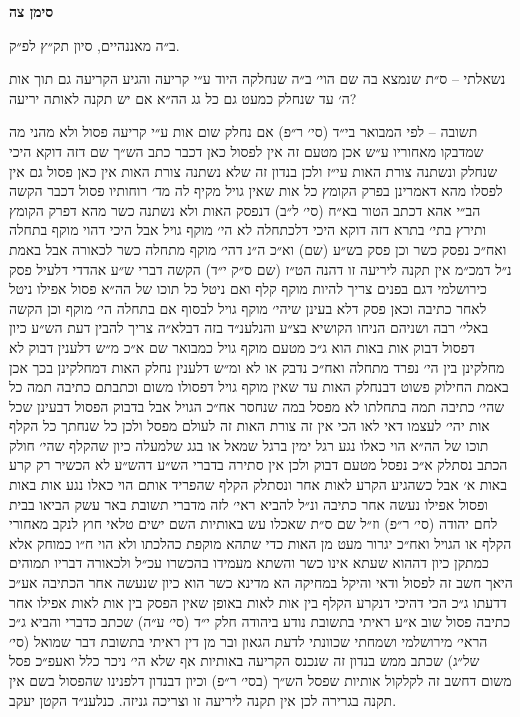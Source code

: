 \documentclass[12pt, openany]{book}
\newcommand{\chapname}{}
\newcommand{\newchap}[1]{
	\addcontentsline{toc}{chapter}{#1}
	\renewcommand{\chapname}{#1}
		\begin{center}
			\textbf{%
\fontsize{16pt}{16pt}\selectfont
				#1}
		\end{center}
}
\begin{document}
\newchap{סימן צה}
\begin{multicols}{2}
ב״ה מאננהיים, סיון תק״ץ לפ״ק.\\\vspace{0pt}

נשאלתי – ס״ת שנמצא בה שם הוי׳ ב״ה שנחלקה היוד ע״י קריעה והגיע הקריעה גם תוך אות ה׳ עד שנחלק כמעט גם כל גג הה״א אם יש תקנה לאותה יריעה?\\\vspace{0pt}

תשובה – לפי המבואר בי״ד (סי׳ ר״פ) אם נחלק שום אות ע״י קריעה פסול ולא מהני מה שמדבקו מאחוריו ע״ש אכן מטעם זה אין לפסול כאן דכבר כתב הש״ך שם דזה דוקא היכי שנחלק ונשתנה צורת האות עי״ז ולכן בנדון זה שלא נשתנה צורת האות אין כאן פסול גם אין לפסלו מהא דאמרינן בפרק הקומץ כל אות שאין גויל מקיף לה מד׳ רוחותיו פסול דכבר הקשה הב״י אהא דכתב הטור בא״ח (סי׳ ל״ב) דנפסק האות ולא נשתנה כשר מהא דפרק הקומץ ותירץ בתי׳ בתרא דזה דוקא היכי דלכתחלה לא הי׳ מוקף גויל אבל היכי דהוי מוקף בתחלה ואח״כ נפסק כשר וכן פסק בש״ע (שם) וא״כ ה״נ דהי׳ מוקף מתחלה כשר לכאורה אבל באמת נ״ל דמכ״מ אין תקנה ליריעה זו דהנה הט״ז (שם ס״ק י״ד) הקשה דברי ש״ע אהדדי דלעיל פסק כירושלמי דגם בפנים צריך להיות מוקף קלף ואם ניטל כל תוכו של הה״א פסול אפילו ניטל לאחר כתיבה וכאן פסק דלא בעינן שיהי׳ מוקף גויל לבסוף אם בתחלה הי׳ מוקף וכן הקשה באלי׳ רבה ושניהם הניחו הקושיא בצ״ע והנלענ״ד בזה דבלא״ה צריך להבין דעת הש״ע כיון דפסול דבוק אות באות הוא ג״כ מטעם מוקף גויל כמבואר שם א״כ מ״ש דלענין דבוק לא מחלקינן בין הי׳ נפרד מתחלה ואח״כ נדבק או לא ומ״ש דלענין נחלק האות דמחלקינן בכך אכן באמת החילוק פשוט דבנחלק האות עד שאין מוקף גויל דפסולו משום וכתבתם כתיבה תמה כל שהי׳ כתיבה תמה בתחלתו לא מפסל במה שנחסר אח״כ הגויל אבל בדבוק הפסול דבעינן שכל אות יהי׳ לעצמו דאי לאו הכי אין זה צורת האות זה לעולם מפסל ולכן כל שנחתך כל הקלף תוכו של הה״א הוי כאלו נגע רגל ימין ברגל שמאל או בגג שלמעלה כיון שהקלף שהי׳ חולק הכתב נסתלק א״כ נפסל מטעם דבוק ולכן אין סתירה בדברי הש״ע דהש״ע לא הכשיר רק קרע באות א׳ אבל כשהגיע הקרע לאות אחר ונסתלק הקלף שהפריד אותם הוי כאלו נגע אות באות ופסול אפילו נעשה אחר כתיבה ונ״ל להביא ראי׳ לזה מדברי תשובת באר עשק הביאו בבית לחם יהודה (סי׳ ר״פ) וז״ל שם ס״ת שאכלו עש באותיות השם ישים טלאי חוץ לנקב מאחורי הקלף או הגויל ואח״כ יגרור מעט מן האות כדי שתהא מוקפת כהלכתו ולא הוי ח״ו כמוחק אלא כמתקן כיון דההוא שעתא אינו כשר והשתא מעמידו בהכשרו עכ״ל ולכאורה דבריו תמוהים היאך חשב זה לפסול ודאי והיקל במחיקה הא מדינא כשר הוא כיון שנעשה אחר הכתיבה אע״כ דדעתו ג״כ הכי דהיכי דנקרע הקלף בין אות לאות באופן שאין הפסק בין אות לאות אפילו אחר כתיבה פסול שוב א״ע ראיתי בתשובת נודע ביהודה חלק י״ד (סי׳ ע״ה) שכתב כדברי והביא ג״כ הראי׳ מירושלמי ושמחתי שכוונתי לדעת הגאון ובר מן דין ראיתי בתשובת דבר שמואל (סי׳ של״ג) שכתב ממש בנדון זה שנכנס הקריעה באותיות אף שלא הי׳ ניכר כלל ואעפ״כ פסל משום דחשב זה לקלקול אותיות שפסל הש״ך (בסי׳ ר״פ) וכיון דבנדון דלפנינו שהפסול בשם אין תקנה בגרירה לכן אין תקנה ליריעה זו וצריכה גניזה. כנלענ״ד הקטן יעקב.\\\vspace{0pt}

\end{multicols}\newpage
\end{document}
